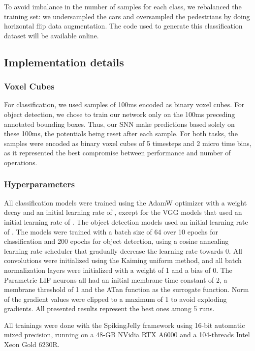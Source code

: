 \documentclass[conference]{IEEEtran}
\begin{document}
To avoid imbalance in the number of samples for each class, we rebalanced the training set: we undersampled the cars and oversampled the pedestrians by doing horizontal flip data augmentation. The code used to generate this classification dataset will be available online.

\subsection{Implementation details}
\subsubsection{Voxel Cubes \label{voxel}}
For classification, we used samples of 100ms encoded as binary voxel cubes. For object detection, we chose to train our network only on the 100ms preceding annotated bounding boxes. Thus, our SNN make predictions based solely on these 100ms, the potentials being reset after each sample. 
For both tasks, the samples were encoded as binary voxel cubes of 5 timesteps and 2 micro time bins, as it represented the best compromise between performance and number of operations. 

\subsubsection{Hyperparameters}
All classification models were trained using the AdamW optimizer with a  weight decay and an initial learning rate of , except for the VGG models that used an initial learning rate of . The object detection models used an initial learning rate of . The models were trained with a batch size of 64 over 10 epochs for classification and 200 epochs for object detection, using a cosine annealing learning rate scheduler that gradually decrease the learning rate towards 0. All convolutions were initialized using the Kaiming uniform method, and all batch normalization layers were initialized with a weight of 1 and a bias of 0. The Parametric LIF neurons all had an initial membrane time constant  of 2, a membrane threshold of 1 and the ATan function as the surrogate function. Norm of the gradient values were clipped to a maximum of 1 to avoid exploding gradients. 
All presented results represent the best ones among 5 runs. 

All trainings were done with the SpikingJelly framework \cite{spikingjelly} using 16-bit automatic mixed precision, running on a 48-GB NVidia RTX A6000 and a 104-threads Intel Xeon Gold 6230R.
\end{document}
